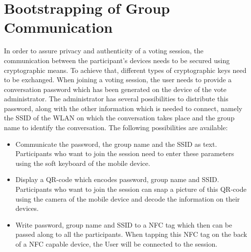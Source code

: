 \documentclass[numbers=noenddot, abstract=on, a4paper, headsepline,
footsepline, oneside, openright, draft=off, listof=leveldown]{scrreprt}
\begin{document}
% 



\section{Bootstrapping of Group Communication}
\label{sec:bootstraping}
In order to assure privacy and authenticity of a voting session, the
communication between the participant's devices needs to be secured using
cryptographic means. To achieve that, different types of cryptographic keys need
to be exchanged. When joining a voting session, the user needs to provide a
conversation password which has been generated on the device of the vote
administrator. The administrator has several possibilities to distribute this
password, along with the other information which is needed to connect, namely
the SSID of the WLAN on which the conversation takes place and the group name to
identify the conversation. The following possibilities are available:
\begin{itemize}
  \item Communicate the password, the group name and the SSID as text.
  Participants who want to join the session need to enter these parameters using
  the soft keyboard of the mobile device.
  \item Display a QR-code which encodes password, group name and SSID.
  Participants who want to join the session can snap a picture of this QR-code
  using the camera of the mobile device and decode the information on their
  devices.
  \item Write password, group name and SSID to a NFC tag which then can be passed
  along to all the participants. When tapping this NFC tag on the back of a NFC
  capable device, the User will be connected to the session.
\end{itemize}
\end{document}
